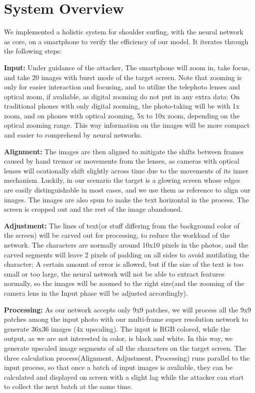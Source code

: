 \section{System Overview}
\label{sec-system-overview} 
We implemented a holistic system for shoulder surfing, with the neural network as core, on a smartphone to verify the efficiency of our model. It iterates through the following steps: 

\vspace{1mm}
\noindent
\textbf{Input:} Under guidance of the attacker, The smartphone will zoom in, take focus, and take 20 images with burst mode of the target screen. Note that zooming is only for easier interaction and focusing, and to utilize the telephoto lenses and optical zoom, if avaliable, as digital zooming do not put in any extra data; On traditional phones with only digital zooming, the photo-taking will be with 1x zoom, and on phones with optical zooming, 5x to 10x zoom, depending on the optical zooming range. This way information on the images will be more compact and easier to comprehend by neural networks.

\vspace{1mm}
\noindent
\textbf{Alignment:} The images are then aligned to mitigate the shifts between frames caused by hand tremor or movements from the lenses, as cameras with optical lenses will ocationally shift slightly across time due to the movements of its inner mechanism. Luckily, in our scenario the target is a glowing screen whose edges are easily distinguishable in most cases, and we use them as reference to align our images. The images are also spun to make the text horizontal in the process. The screen is cropped out and the rest of the image abandoned.


\vspace{1mm}
\noindent
\textbf{Adjustment:} The lines of text(or stuff differing from the background color of the screen) will be carved out for processing, to reduce the workload of the network. The characters are normally around 10x10 pixels in the photos, and the carved segments will leave 2 pixels of padding on all sides to avoid mutilating the character; A certain amount of error is allowed, but if the size of the text is too small or too large, the neural network will not be able to extract features normally, so the images will be zoomed to the right size(and the zooming of the camera lens in the Input phase will be adjusted accordingly).


\vspace{1mm}
\noindent
\textbf{Processing:} As our network accepts only 9x9 patches, we will process all the 9x9 patches among the input photo with our multi-frame super resolution network to generate 36x36 images (4x upscaling). The input is RGB colored, while the output, as we are not interested in color, is black and white. In this way, we generate upscaled image segments of all the characters on the target screen. The three calculation process(Alignment, Adjustment, Processing) runs parallel to the input process, so that once a batch of input images is avaliable, they can be calculated and displayed on screen with a slight lag while the attacker can start to collect the next batch at the same time.
		
